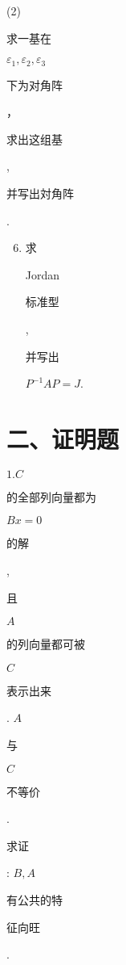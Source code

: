 \documentclass[10pt]{article}
\begin{document}
(2) \begin{CJK}{UTF8}{mj}求一基在\end{CJK} $\varepsilon_{1}, \varepsilon_{2}, \varepsilon_{3}$ \begin{CJK}{UTF8}{mj}下为对角阵\end{CJK}，\begin{CJK}{UTF8}{mj}求出这组基\end{CJK}, \begin{CJK}{UTF8}{mj}并写出対角阵\end{CJK}.

\begin{enumerate}
  \setcounter{enumi}{5}
  \item \begin{CJK}{UTF8}{mj}求\end{CJK} Jordan \begin{CJK}{UTF8}{mj}标准型\end{CJK}, \begin{CJK}{UTF8}{mj}并写出\end{CJK} $P^{-1} A P=J$.
\end{enumerate}
\section{二、证明题}
$1 . C$ \begin{CJK}{UTF8}{mj}的全部列向量都为\end{CJK} $B x=0$ \begin{CJK}{UTF8}{mj}的解\end{CJK}, \begin{CJK}{UTF8}{mj}且\end{CJK} $A$ \begin{CJK}{UTF8}{mj}的列向量都可被\end{CJK} $C$ \begin{CJK}{UTF8}{mj}表示出来\end{CJK}. $A$ \begin{CJK}{UTF8}{mj}与\end{CJK} $C$ \begin{CJK}{UTF8}{mj}不等价\end{CJK}. \begin{CJK}{UTF8}{mj}求证\end{CJK}: $B, A$ \begin{CJK}{UTF8}{mj}有公共的特\end{CJK} \begin{CJK}{UTF8}{mj}征向旺\end{CJK}.
\end{document}
